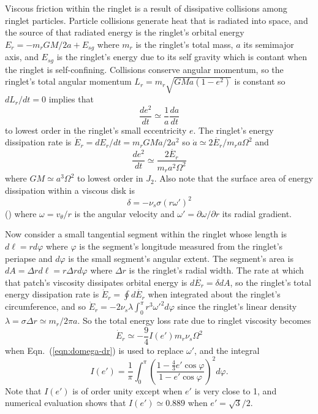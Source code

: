 \documentclass[preprint]{aastex62}
\begin{document}
Viscous friction within the ringlet is a result of dissipative collisions among ringlet particles.
Particle collisions generate heat that is radiated into space, and the source of that radiated energy
is the ringlet's orbital energy $E_r=-m_rGM/2a + E_{sg}$ where $m_r$ is the ringlet's total
mass, $a$ its semimajor axis, and $E_{sg}$ is the ringlet's energy due to its self gravity
which is contant when the ringlet is self-confining. 
Collisions conserve angular momentum, so the ringlet's total angular momentum
$L_r=m_r\sqrt{GMa(1-e^2)}$ is constant so $dL_r/dt=0$ implies that
\begin{equation}
    \label{eqn:e2-dot}
    \frac{de^2}{dt} \simeq \frac{1}{a}\frac{da}{dt}
\end{equation}
to lowest order in the ringlet's small eccentricity $e$.
The ringlet's energy dissipation rate is $\dot{E}_r = dE_r/dt=m_rGM\dot{a}/2a^2$ so
$\dot{a}\simeq2\dot{E_r}/m_ra\Omega^2$ and 
\begin{equation}
    \label{eqn:de2/dt}
    \frac{de^2}{dt} \simeq \frac{2\dot{E_r}}{m_r a^2\Omega^2}
\end{equation}
where $GM\simeq a^3\Omega^2$ to lowest order in $J_2$. Also note that
the surface area of energy dissipation within a viscous disk is
\begin{equation}
    \delta = -\nu_s\sigma(r\omega')^2
\end{equation}
(\citealt{P81}) where $\omega=v_\theta/r$ is the angular velocity and 
$\omega'=\partial\omega/\partial r$ its radial gradient.

Now consider a small tangential segment within the ringlet whose length is $d\ell=rd\varphi$ where 
$\varphi$ is the segment's longitude measured from the ringlet's periapse and
$d\varphi$ is the small segment's angular extent. The segment's area is 
$dA=\Delta rd\ell=r\Delta r d\varphi$
where $\Delta r$ is the ringlet's radial width.
The rate at which that patch's viscosity dissipates orbital energy is $d\dot{E_r}=\delta dA$, so
the ringlet's total energy dissipation rate is 
$\dot{E}_r = \oint d\dot{E_r}$ when integrated about the ringlet's circumference, and so
$\dot{E}_r = -2\nu_s\lambda\int_0^\pi r^3\omega'^2d\varphi$
since the ringlet's linear density $\lambda=\sigma\Delta r\simeq m_r/2\pi a$. So the
total energy loss rate due to ringlet viscosity becomes
\begin{equation}
    \label{eqn:dE_r/dt}
    \dot{E}_r \simeq -\frac{9}{4}I(e')m_r\nu_s\Omega^2
\end{equation}
when Eqn.\ (\ref{eqn:domega-dr}) is used to replace $\omega'$, and the integral 
\begin{equation}
    I(e') =  \frac{1}{\pi}\int_0^\pi\left(\frac{1-\frac{4}{3}e'\cos\varphi}{1-e'\cos\varphi}\right)^2d\varphi .
\end{equation}
Note that  $I(e')$ is of order
unity except when $e'$ is very close to 1, and numerical evaluation shows that $I(e')\simeq0.889$
when $e'=\sqrt{3}/2$.
\end{document}
